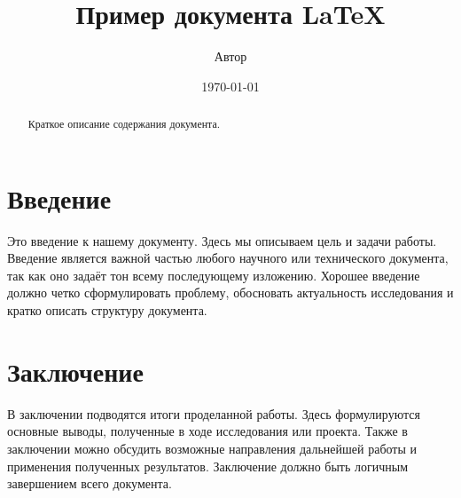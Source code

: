 \documentclass{article}
\title{Пример документа LaTeX}
\author{Автор}
\date{\today}
\begin{document}
\maketitle

\begin{abstract}
Краткое описание содержания документа.
\end{abstract}

\section{Введение}
Это введение к нашему документу. Здесь мы описываем цель и задачи работы. Введение является важной частью любого научного или технического документа, так как оно задаёт тон всему последующему изложению. Хорошее введение должно четко сформулировать проблему, обосновать актуальность исследования и кратко описать структуру документа.

\section{Заключение}
В заключении подводятся итоги проделанной работы. Здесь формулируются основные выводы, полученные в ходе исследования или проекта. Также в заключении можно обсудить возможные направления дальнейшей работы и применения полученных результатов. Заключение должно быть логичным завершением всего документа.
\end{document}
